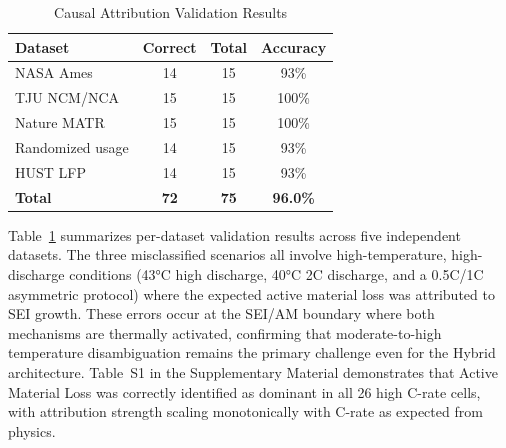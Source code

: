 \documentclass[5p,times,authoryear]{elsarticle}
\begin{document}
\begin{table}[!htb]
\caption{Causal Attribution Validation Results}
\begin{center}
\begin{tabular}{lccc}
\toprule
\textbf{Dataset} & \textbf{Correct} & \textbf{Total} & \textbf{Accuracy} \\
\midrule
NASA Ames & 14 & 15 & 93\% \\
TJU NCM/NCA & 15 & 15 & 100\% \\
Nature MATR & 15 & 15 & 100\% \\
Randomized usage & 14 & 15 & 93\% \\
HUST LFP & 14 & 15 & 93\% \\
\midrule
\textbf{Total} & \textbf{72} & \textbf{75} & \textbf{96.0\%} \\
\bottomrule
\end{tabular}
\end{center}
\label{tab:attribution}
\end{table}

Table~\ref{tab:attribution} summarizes per-dataset validation results across five independent datasets. The three misclassified scenarios all involve high-temperature, high-discharge conditions (43°C high discharge, 40°C 2C discharge, and a 0.5C/1C asymmetric protocol) where the expected active material loss was attributed to SEI growth. These errors occur at the SEI/AM boundary where both mechanisms are thermally activated, confirming that moderate-to-high temperature disambiguation remains the primary challenge even for the Hybrid architecture.
Table~S1 in the Supplementary Material demonstrates that Active Material Loss was correctly identified as dominant in all 26 high C-rate cells, with attribution strength scaling monotonically with C-rate as expected from physics.
\end{document}
